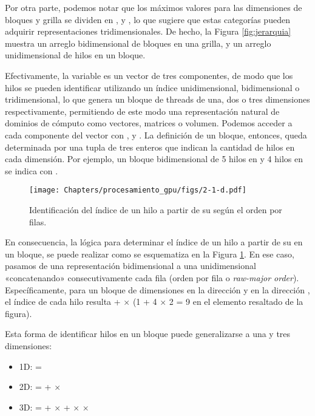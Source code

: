 Por otra parte, podemos notar que los máximos valores para las dimensiones de bloques y grilla se dividen en ,  y , lo que sugiere que estas categorías pueden adquirir representaciones tridimensionales. De hecho, la Figura \ref{fig:jerarquia} muestra un arreglo bidimensional de bloques en una grilla, y un arreglo unidimensional de hilos en un bloque.

Efectivamente, la variable  es un vector de tres componentes, de modo que los hilos se pueden identificar utilizando un índice unidimensional, bidimensional o tridimensional, lo que genera un bloque de threads de una, dos o tres dimensiones respectivamente, permitiendo de este modo una representación natural de dominios de cómputo como vectores, matrices o volumen. Podemos acceder a cada componente del vector con ,  y . La definición de un bloque, entonces, queda determinada por una tupla de tres enteros que indican la cantidad de hilos en cada dimensión. Por ejemplo, un bloque bidimensional de 5 hilos en  y 4 hilos en  se indica con .

\begin{figure}
    \begin{center}
        \texttt{[image: Chapters/procesamiento\_gpu/figs/2-1-d.pdf]}
        \caption{Identificación del índice de un hilo a partir de su  según el orden por filas.}
        \label{fig:2to1idx}
    \end{center}
\end{figure}

En consecuencia, la lógica para determinar el índice de un hilo a partir de su  en un bloque, se puede realizar como se esquematiza en la Figura \ref{fig:2to1idx}. En ese caso, pasamos de una representación bidimensional a una unidimensional «concatenando» consecutivamente cada fila (orden por fila o \textit{raw-major order}). Específicamente, para un bloque de dimensiones  en la dirección  y  en la dirección , el índice de cada hilo resulta  +  $\times$  (1 + 4 $\times$ 2 = 9 en el elemento resaltado de la figura).

Esta forma de identificar hilos en un bloque puede generalizarse a una y tres dimensiones:
\begin{itemize}
    \item 1D:  = 
    \item 2D:  =  +  $\times$ 
    \item 3D:  =  +  $\times$  +  $\times$  $\times$ 
\end{itemize}

